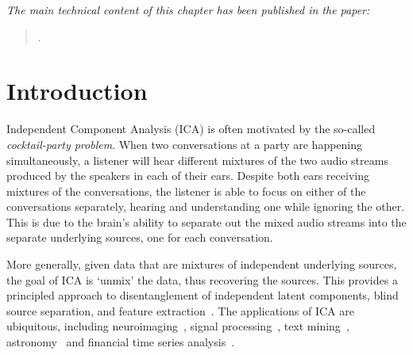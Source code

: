 \emph{The main technical content of this chapter has been published in the paper:}

\begin{quote}
	.
\end{quote}



\section{Introduction}


Independent Component Analysis (ICA) is often motivated by the so-called \emph{cocktail-party problem}.
When two conversations at a party are happening simultaneously, a listener will hear different mixtures of the two audio streams produced by the speakers in each of their ears.
Despite both ears receiving mixtures of the conversations, the listener is able to focus on either of the conversations separately, hearing and understanding one while ignoring the other.
This is due to the brain's ability to separate out the mixed audio streams into the separate underlying sources, one for each conversation.

More generally, given data that are mixtures of independent underlying sources, the goal of ICA is `unmix' the data, thus recovering the sources.
This provides a principled approach to disentanglement of independent latent components, blind source separation, and feature extraction~\citep{hyvarinen2000independent}.
The applications of ICA are ubiquitous, including neuroimaging~\citep{mckeown1998independent}, signal processing~\citep{sawada2003direction}, text mining~\citep{honkela2010wordica}, astronomy~\citep{nuzillard2000blind} and financial time series analysis~\citep{oja2000independent}.

